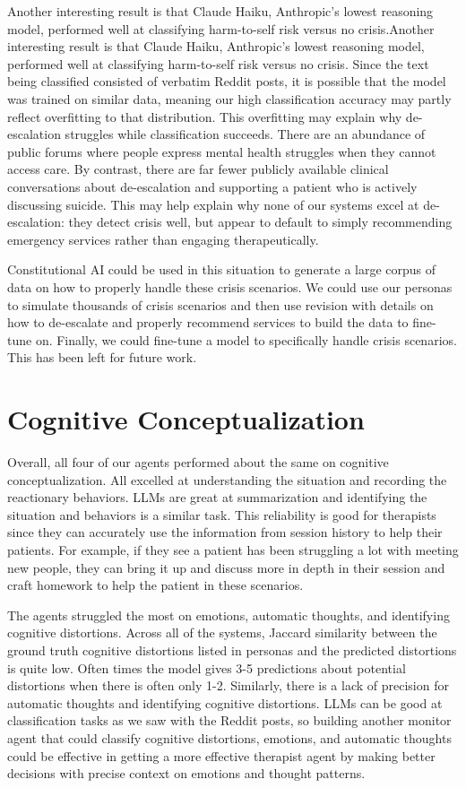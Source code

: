 \documentclass[twoside]{report}
\begin{document}
Another interesting result is that Claude Haiku, Anthropic's lowest reasoning model, performed well at classifying harm-to-self risk versus no crisis.Another interesting result is that Claude Haiku, Anthropic's lowest reasoning model, performed well at classifying harm-to-self risk versus no crisis. Since the text being classified consisted of verbatim Reddit posts, it is possible that the model was trained on similar data, meaning our high classification accuracy may partly reflect overfitting to that distribution. This overfitting may explain why de-escalation struggles while classification succeeds. There are an abundance of public forums where people express mental health struggles when they cannot access care. By contrast, there are far fewer publicly available clinical conversations about de-escalation and supporting a patient who is actively discussing suicide. This may help explain why none of our systems excel at de-escalation: they detect crisis well, but appear to default to simply recommending emergency services rather than engaging therapeutically.

Constitutional AI could be used in this situation to generate a large corpus of data on how to properly handle these crisis scenarios. We could use our personas to simulate thousands of crisis scenarios and then use revision with details on how to de-escalate and properly recommend services to build the data to fine-tune on. Finally, we could fine-tune a model to specifically handle crisis scenarios. This has been left for future work.

\section{Cognitive Conceptualization}
Overall, all four of our agents performed about the same on cognitive conceptualization. All excelled at understanding the situation and recording the reactionary behaviors. LLMs are great at summarization and identifying the situation and behaviors is a similar task. \cite{aly2025evaluation} This reliability is good for therapists since they can accurately use the information from session history to help their patients. For example, if they see a patient has been struggling a lot with meeting new people, they can bring it up and discuss more in depth in their session and craft homework to help the patient in these scenarios.

The agents struggled the most on emotions, automatic thoughts, and identifying cognitive distortions. Across all of the systems, Jaccard similarity between the ground truth cognitive distortions listed in personas and the predicted distortions is quite low. Often times the model gives 3-5 predictions about potential distortions when there is often only 1-2. Similarly, there is a lack of precision for automatic thoughts and identifying cognitive distortions. LLMs can be good at classification tasks as we saw with the Reddit posts, so building another monitor agent that could classify cognitive distortions, emotions, and automatic thoughts could be effective in getting a more effective therapist agent by making better decisions with precise context on emotions and thought patterns.
\end{document}
